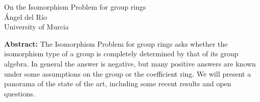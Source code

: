 \documentclass[12pt,a4paper]{article}
\begin{document}
\thispagestyle{empty} 
\begin{center}
{\large  On the Isomorphism Problem for group rings}\\
\vspace*{.5cm}
\'Angel del R\'io\\
University of Murcia\\
\end{center}
\vspace*{.8cm}

{\bf Abstract:} The Isomorphism Problem for group rings asks whether the isomorphism type of a group is completely determined by that of its group algebra. In general the answer is negative, but many positive answers are known under some assumptions on the group or the coefficient ring. We will present a panorama of the state of the art, including some recent results and open questions. 
\end{document}
